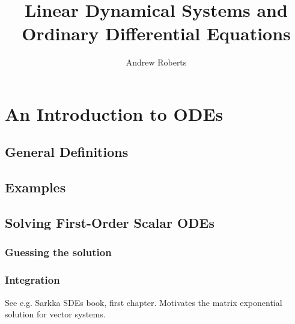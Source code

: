 \documentclass[12pt]{article}
\title{Linear Dynamical Systems and Ordinary Differential Equations}
\author{Andrew Roberts}
\begin{document}
\maketitle
\tableofcontents
\newpage

\section{An Introduction to ODEs}

\subsection{General Definitions}

\subsection{Examples}

\subsection{Solving First-Order Scalar ODEs}

\subsubsection{Guessing the solution}

\subsubsection{Integration}
See e.g. Sarkka SDEs book, first chapter. Motivates the matrix exponential solution for vector systems. 



\end{document}
